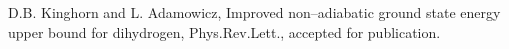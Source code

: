 \begin{thebibliography}{999}
D.B. Kinghorn and L. Adamowicz,
Improved non--adiabatic ground state energy
upper bound for dihydrogen,
Phys.Rev.Lett., accepted for publication.








%




\end{thebibliography}
